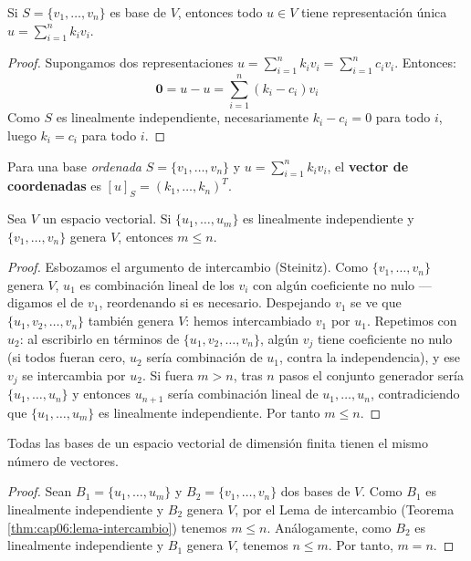 \begin{theorem}\label{thm:unicidad-representacion}
Si $S = \{v_1,\dots,v_n\}$ es base de $V$, entonces todo $u \in V$ tiene representación única $u = \sum_{i=1}^n k_i v_i$.	
\begin{proof}
Supongamos dos representaciones $u = \sum_{i=1}^n k_i v_i = \sum_{i=1}^n c_i v_i$. Entonces:
$$\mathbf{0} = u - u = \sum_{i=1}^n (k_i - c_i)v_i$$
Como $S$ es linealmente independiente, necesariamente $k_i - c_i = 0$ para todo $i$, luego $k_i = c_i$ para todo $i$.
\end{proof}
\end{theorem}

\begin{definition}\label{def:vectorcoordenadas}
Para una base \textit{ordenada} $S = \{v_1,\dots,v_n\}$ y $u = \sum_{i=1}^n k_i v_i$, el \textbf{vector de coordenadas} es $[u]_S = (k_1,\dots,k_n)^T$.
\end{definition}

\begin{theorem}\label{thm:cap06:lema-intercambio}
Sea $V$ un espacio vectorial. Si $\{u_1, \ldots, u_m\}$ es linealmente independiente y $\{v_1, \ldots, v_n\}$ genera $V$, entonces $m \leq n$.
\begin{proof}
Esbozamos el argumento de intercambio (Steinitz). Como $\{v_1,\ldots,v_n\}$ genera $V$, $u_1$ es combinación lineal de los $v_i$ con algún coeficiente no nulo — digamos el de $v_1$, reordenando si es necesario. Despejando $v_1$ se ve que $\{u_1, v_2, \ldots, v_n\}$ también genera $V$: hemos intercambiado $v_1$ por $u_1$. Repetimos con $u_2$: al escribirlo en términos de $\{u_1, v_2,\ldots,v_n\}$, algún $v_j$ tiene coeficiente no nulo (si todos fueran cero, $u_2$ sería combinación de $u_1$, contra la independencia), y ese $v_j$ se intercambia por $u_2$. Si fuera $m > n$, tras $n$ pasos el conjunto generador sería $\{u_1,\ldots,u_n\}$ y entonces $u_{n+1}$ sería combinación lineal de $u_1,\ldots,u_n$, contradiciendo que $\{u_1,\ldots,u_m\}$ es linealmente independiente. Por tanto $m \leq n$.
\end{proof}
\end{theorem}

\begin{theorem}\label{thm:cap06:invariancia-base}
Todas las bases de un espacio vectorial de dimensión finita tienen el mismo número de vectores.
\begin{proof}
Sean $B_1 = \{u_1, \ldots, u_m\}$ y $B_2 = \{v_1, \ldots, v_n\}$ dos bases de $V$. Como $B_1$ es linealmente independiente y $B_2$ genera $V$, por el Lema de intercambio (Teorema \ref{thm:cap06:lema-intercambio}) tenemos $m \leq n$. Análogamente, como $B_2$ es linealmente independiente y $B_1$ genera $V$, tenemos $n \leq m$. Por tanto, $m = n$.
\end{proof}
\end{theorem}

